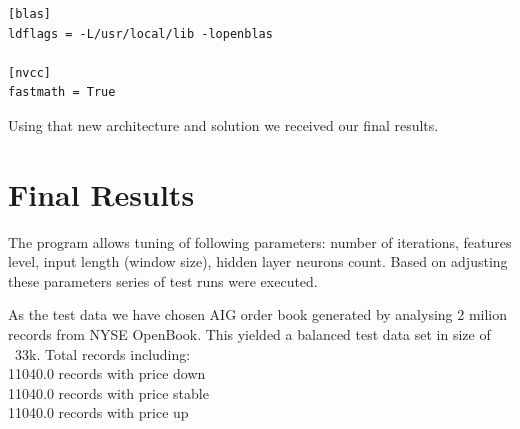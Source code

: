 \documentclass[twoside]{article}
\begin{document}
\begin{multicols}{2}
\begin{lstlisting}
[blas]
ldflags = -L/usr/local/lib -lopenblas

[nvcc]
fastmath = True
\end{lstlisting}

Using that new architecture and solution we received our final results.

\section{Final Results}
The program allows tuning of following parameters: number of iterations, features level, input length (window size), hidden layer neurons count.
Based on adjusting these parameters series of test runs were executed.

As the test data we have chosen AIG order book generated by analysing 2 milion records from NYSE OpenBook. This yielded a balanced test data set in size of ~33k.
 Total records including: \\
11040.0 records with price down \\
11040.0 records with price stable \\
11040.0 records with price up \\
\newline



\end{multicols}
\end{document}
